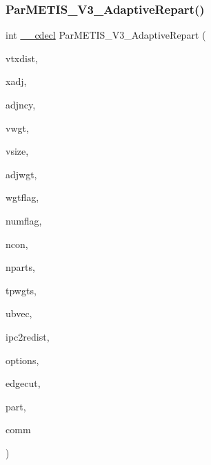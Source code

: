 \subsubsection{\texorpdfstring{Par\+M\+E\+T\+I\+S\+\_\+\+V3\+\_\+\+Adaptive\+Repart()}{ParMETIS\_V3\_AdaptiveRepart()}}
{\footnotesize\ttfamily int \hyperlink{a00843_a238347d7669f8f1e9c83bfe63a2730c4}{\+\_\+\+\_\+cdecl} Par\+M\+E\+T\+I\+S\+\_\+\+V3\+\_\+\+Adaptive\+Repart (\begin{DoxyParamCaption}\item[{\hyperlink{a00876_aaa5262be3e700770163401acb0150f52}{idx\+\_\+t} $\ast$}]{vtxdist,  }\item[{\hyperlink{a00876_aaa5262be3e700770163401acb0150f52}{idx\+\_\+t} $\ast$}]{xadj,  }\item[{\hyperlink{a00876_aaa5262be3e700770163401acb0150f52}{idx\+\_\+t} $\ast$}]{adjncy,  }\item[{\hyperlink{a00876_aaa5262be3e700770163401acb0150f52}{idx\+\_\+t} $\ast$}]{vwgt,  }\item[{\hyperlink{a00876_aaa5262be3e700770163401acb0150f52}{idx\+\_\+t} $\ast$}]{vsize,  }\item[{\hyperlink{a00876_aaa5262be3e700770163401acb0150f52}{idx\+\_\+t} $\ast$}]{adjwgt,  }\item[{\hyperlink{a00876_aaa5262be3e700770163401acb0150f52}{idx\+\_\+t} $\ast$}]{wgtflag,  }\item[{\hyperlink{a00876_aaa5262be3e700770163401acb0150f52}{idx\+\_\+t} $\ast$}]{numflag,  }\item[{\hyperlink{a00876_aaa5262be3e700770163401acb0150f52}{idx\+\_\+t} $\ast$}]{ncon,  }\item[{\hyperlink{a00876_aaa5262be3e700770163401acb0150f52}{idx\+\_\+t} $\ast$}]{nparts,  }\item[{\hyperlink{a00876_a1924a4f6907cc3833213aba1f07fcbe9}{real\+\_\+t} $\ast$}]{tpwgts,  }\item[{\hyperlink{a00876_a1924a4f6907cc3833213aba1f07fcbe9}{real\+\_\+t} $\ast$}]{ubvec,  }\item[{\hyperlink{a00876_a1924a4f6907cc3833213aba1f07fcbe9}{real\+\_\+t} $\ast$}]{ipc2redist,  }\item[{\hyperlink{a00876_aaa5262be3e700770163401acb0150f52}{idx\+\_\+t} $\ast$}]{options,  }\item[{\hyperlink{a00876_aaa5262be3e700770163401acb0150f52}{idx\+\_\+t} $\ast$}]{edgecut,  }\item[{\hyperlink{a00876_aaa5262be3e700770163401acb0150f52}{idx\+\_\+t} $\ast$}]{part,  }\item[{M\+P\+I\+\_\+\+Comm $\ast$}]{comm }\end{DoxyParamCaption})}

